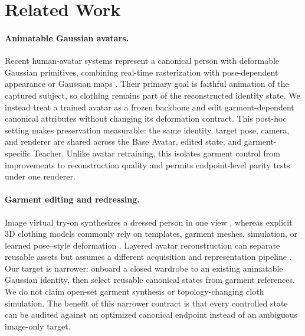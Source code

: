 \documentclass[letterpaper]{article}
\begin{document}
\section{Related Work}

\paragraph{Animatable Gaussian avatars.}
Recent human-avatar systems represent a canonical person with deformable Gaussian primitives, combining real-time rasterization with pose-dependent appearance or Gaussian maps \citep{Li_2024_CVPR,Qian_2024_CVPR,Kocabas_2024_CVPR}. Their primary goal is faithful animation of the captured subject, so clothing remains part of the reconstructed identity state. We instead treat a trained avatar as a frozen backbone and edit garment-dependent canonical attributes without changing its deformation contract. This post-hoc setting makes preservation measurable: the same identity, target pose, camera, and renderer are shared across the Base Avatar, edited state, and garment-specific Teacher.
Unlike avatar retraining, this isolates garment control from improvements to reconstruction quality and permits endpoint-level parity tests under one renderer.

\paragraph{Garment editing and redressing.}
Image virtual try-on synthesizes a dressed person in one view \citep{Neuberger_2020_CVPR}, whereas explicit 3D clothing models commonly rely on templates, garment meshes, simulation, or learned pose--style deformation \citep{Ma_2020_CVPR,Patel_2020_CVPR}. Layered avatar reconstruction can separate reusable assets but assumes a different acquisition and representation pipeline \citep{Kim_2024_CVPR}. Our target is narrower: onboard a closed wardrobe to an existing animatable Gaussian identity, then select reusable canonical states from garment references. We do not claim open-set garment synthesis or topology-changing cloth simulation.
The benefit of this narrower contract is that every controlled state can be audited against an optimized canonical endpoint instead of an ambiguous image-only target.
\end{document}
